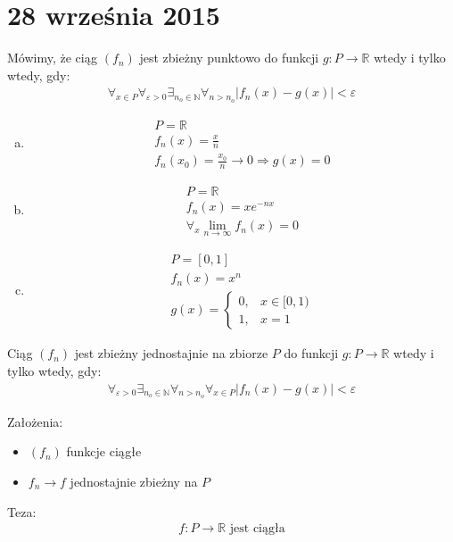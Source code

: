 \chapter{28 września 2015}
\begin{defi}
Mówimy, że ciąg $ \left(f_n\right) $ jest zbieżny punktowo do funkcji $ g:P\rightarrow \mathbb R $ wtedy i tylko wtedy, gdy:
\begin{gather*}
\forall_{x\in P}\forall_{\varepsilon>0}\exists_{n_o\in \mathbb{N}}\forall_{n>n_o}
\left|f_n(x)-g(x)\right|<\varepsilon
\end{gather*}
\end{defi}
\begin{prz}\textbf{ }
\begin{enumerate}[a)]
\item 
\begin{gather*}
P=\mathbb R \\
f_n(x)=\frac{x}{n}\\
f_n(x_0)=\frac{x_0}{n}\to0\Rightarrow g(x)=0
\end{gather*}
\item 
\begin{gather*}
P=\mathbb R \\
f_n(x)=xe^{-nx}\\
\forall_x \lim\limits_{n\to\infty } f_n(x)=0
\end{gather*}
\item 
\begin{gather*}
P=[0,1]\\
f_n(x)=x^n\\
g(x)=\left \{
\begin{array}{ll}
0, & x\in[0,1)\\
1, &x=1
\end{array}
\right .
\end{gather*}
\end{enumerate}
\end{prz}
\begin{defi}
Ciąg $ \left(f_n\right) $ jest zbieżny jednostajnie na zbiorze $ P $ do funkcji $ g:P\rightarrow \mathbb R  $ wtedy i tylko wtedy, gdy:
\begin{gather*}
\forall_{\varepsilon>0}
\exists_{n_o\in \mathbb{N}}
\forall_{n>n_o}
\forall_{x\in P}
\left|f_n(x)-g(x)\right|<\varepsilon
\end{gather*}
\end{defi}
\begin{twr}
Założenia:
\begin{itemize}
\item $ \left(f_n\right) $ funkcje ciągłe
\item $ f_n\to f $ jednostajnie zbieżny na $ P $
\end{itemize}
Teza:\\
\begin{gather*}
f:P\rightarrow \mathbb R  \text{ jest ciągła}
\end{gather*}
\end{twr}
